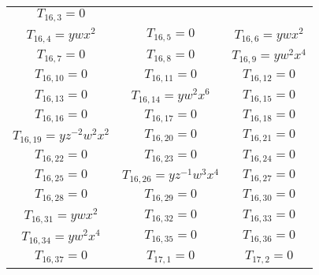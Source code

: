\begin{longtable}{|c|c|c|}
$T_{16,3}= 0$\\

$T_{16,4}= ywx^2$&

$T_{16,5}= 0$&

$T_{16,6}= ywx^2$\\

$T_{16,7}= 0$&

$T_{16,8}= 0$&

$T_{16,9}= yw^2x^4$\\

$T_{16,10}= 0$&

$T_{16,11}= 0$&

$T_{16,12}= 0$\\

$T_{16,13}= 0$&

$T_{16,14}= yw^2x^6$&

$T_{16,15}= 0$\\

$T_{16,16}= 0$&

$T_{16,17}= 0$&

$T_{16,18}= 0$\\

$T_{16,19}= yz^{-2}w^2x^2$&

$T_{16,20}= 0$&

$T_{16,21}= 0$\\

$T_{16,22}= 0$&

$T_{16,23}= 0$&

$T_{16,24}= 0$\\

$T_{16,25}= 0$&

$T_{16,26}= yz^{-1}w^3x^4$&

$T_{16,27}= 0$\\

$T_{16,28}= 0$&

$T_{16,29}= 0$&

$T_{16,30}= 0$\\

$T_{16,31}= ywx^2$&

$T_{16,32}= 0$&

$T_{16,33}= 0$\\

$T_{16,34}= yw^2x^4$&

$T_{16,35}= 0$&

$T_{16,36}= 0$\\

$T_{16,37}= 0$&

$T_{17,1}= 0$&

$T_{17,2}= 0$\\


\end{longtable}
